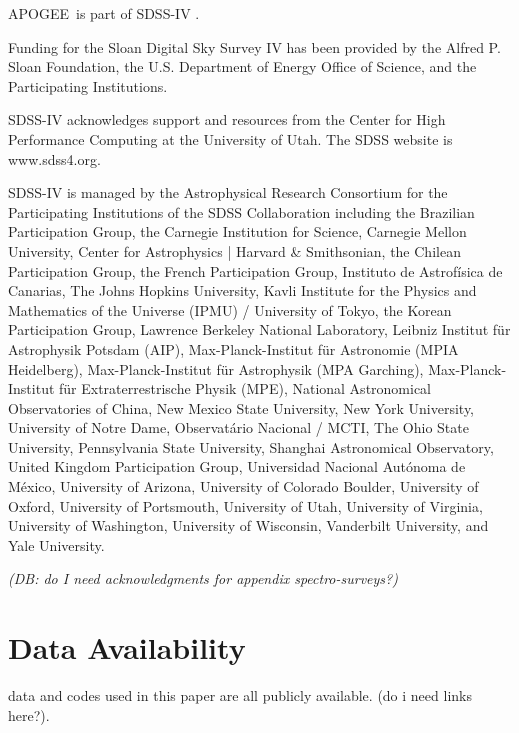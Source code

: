 \documentclass[fleqn,
usenatbib]{mnras}
\newcommand{\apogee}{APOGEE}
\newcommand{\dbadd}[1]{{\color{Thistle} #1}}
\newcommand{\dbnote}[1]{ {\color{Thistle} \textit{\small (DB: #1)}} }
\begin{document}
\apogee\ is part of SDSS-IV \citep{sloan_telescope, apogee_instrumentation, sdss_iv_overview, sdss17, apogee17, aspcap}.

Funding for the Sloan Digital Sky 
Survey IV has been provided by the 
Alfred P. Sloan Foundation, the U.S. 
Department of Energy Office of 
Science, and the Participating 
Institutions. 

SDSS-IV acknowledges support and 
resources from the Center for High 
Performance Computing  at the 
University of Utah. The SDSS 
website is www.sdss4.org.

SDSS-IV is managed by the 
Astrophysical Research Consortium 
for the Participating Institutions 
of the SDSS Collaboration including 
the Brazilian Participation Group, 
the Carnegie Institution for Science, 
Carnegie Mellon University, Center for 
Astrophysics | Harvard \& 
Smithsonian, the Chilean Participation 
Group, the French Participation Group, 
Instituto de Astrof\'isica de 
Canarias, The Johns Hopkins 
University, Kavli Institute for the 
Physics and Mathematics of the 
Universe (IPMU) / University of 
Tokyo, the Korean Participation Group, 
Lawrence Berkeley National Laboratory, 
Leibniz Institut f\"ur Astrophysik 
Potsdam (AIP),  Max-Planck-Institut 
f\"ur Astronomie (MPIA Heidelberg), 
Max-Planck-Institut f\"ur 
Astrophysik (MPA Garching), 
Max-Planck-Institut f\"ur 
Extraterrestrische Physik (MPE), 
National Astronomical Observatories of 
China, New Mexico State University, 
New York University, University of 
Notre Dame, Observat\'ario 
Nacional / MCTI, The Ohio State 
University, Pennsylvania State 
University, Shanghai 
Astronomical Observatory, United 
Kingdom Participation Group, 
Universidad Nacional Aut\'onoma 
de M\'exico, University of Arizona, 
University of Colorado Boulder, 
University of Oxford, University of 
Portsmouth, University of Utah, 
University of Virginia, University 
of Washington, University of 
Wisconsin, Vanderbilt University, 
and Yale University.

\dbnote{do I need acknowledgments for appendix spectro-surveys?}

\section*{Data Availability}

\dbadd{data and codes used in this paper are all publicly available. (do i need links here?). }




\end{document}

